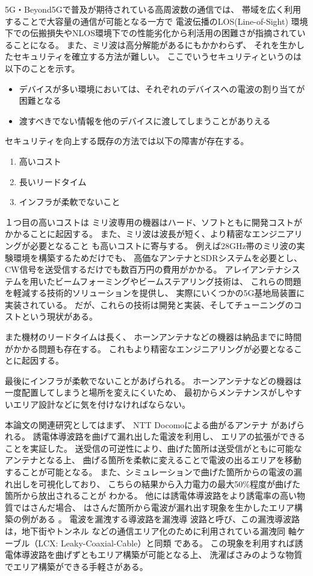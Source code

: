 \documentclass[technicalreport]{ieicej}
\begin{document}
5G・Beyond5Gで普及が期待されている高周波数の通信では、
帯域を広く利用することで大容量の通信が可能となる一方で
電波伝播のLOS(Line-of-Sight)
環境下での伝搬損失やNLOS環境下での性能劣化から利活用の困難さが指摘されていることになる。
また、ミリ波は高分解能があるにもかかわらず、
それを生かしたセキュリティを確立する方法が難しい。
ここでいうセキュリティというのは以下のことを示す。

\begin{itemize}
  \item デバイスが多い環境においては、それぞれのデバイスへの電波の割り当てが困難となる
  \item 渡すべきでない情報を他のデバイスに渡してしまうことがありえる
\end{itemize}

セキュリティを向上する既存の方法では以下の障害が存在する。

\begin{enumerate}
  \item 高いコスト
  \item 長いリードタイム
  \item インフラが柔軟でないこと
\end{enumerate}

１つ目の高いコストは
ミリ波専用の機器はハード、ソフトともに開発コストがかかることに起因する。
また、ミリ波は波長が短く、より精密なエンジニアリングが必要となること
も高いコストに寄与する。
例えば28GHz帯のミリ波の実験環境を構築するためだけでも、
高価なアンテナとSDRシステムを必要とし、
CW信号を送受信するだけでも数百万円の費用がかかる\cite{zep}。
アレイアンテナシステムを用いたビームフォーミングやビームステアリング技術は、
これらの問題を軽減する技術的ソリューションを提供し、
実際にいくつかの5G基地局装置に実装されている。
だが、これらの技術は開発と実装、そしてチューニングのコストという現状がある。

また機材のリードタイムは長く、
ホーンアンテナなどの機器は納品までに時間がかかる問題も存在する。
これもより精密なエンジニアリングが必要となることに起因する。

最後にインフラが柔軟でないことがあげられる。
ホーンアンテナなどの機器は一度配置してしまうと場所を変えにくいため、
最初からメンテナンスがしやすいエリア設計などに気を付けなければならない。

本論文の関連研究としてはまず、
NTT Docomoによる曲がるアンテナ
\cite{bending_antenna} \cite{leaky_wave_antenna_bent_dielectric}
があげられる。
誘電体導波路を曲げて漏れ出した電波を利用し、
エリアの拡張ができることを実証した。
送受信の可逆性により、曲げた箇所は送受信がともに可能なアンテナとなる上、
曲げる箇所を柔軟に変えることで電波の出るエリアを移動することが可能となる。
また、シミュレーションで曲げた箇所からの電波の漏れ出しを可視化しており、
こちらの結果から入力電力の最大50\%程度が曲げた箇所から放出されることが
わかる。
他には誘電体導波路をより誘電率の高い物質ではさんだ場合、
はさんだ箇所から電波が漏れ出す現象を生かしたエリア構築の例がある
\cite{pinching_antenna}。
電波を漏洩する導波路を漏洩導
波路と呼び、この漏洩導波路は，地下街やトンネル
などの通信エリア化のために利用されている漏洩同
軸ケーブル（LCX: Leaky-Coaxial-Cable）と同類
である。
この現象を利用すれば誘電体導波路を曲げずともエリア構築が可能となる上、
洗濯ばさみのような物質でエリア構築ができる手軽さがある。
\end{document}
